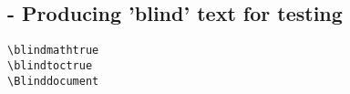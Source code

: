 
\subsection{ - Producing 'blind' text for testing}

\begin{listing}[H]
  \begin{verbatim}
\blindmathtrue
\blindtoctrue
\Blinddocument
  \end{verbatim}
  \caption{}
  \label{listing:blindtext}
\end{listing}
